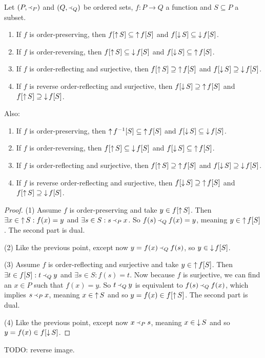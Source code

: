 \begin{lemma} \label{lemma:imageUpDownsets}
Let $(P, \Yleft_P)$ and $(Q, \Yleft_Q)$ be ordered sets, $f: P\to Q$ a function and $S\subseteq P$ a subset.
\begin{enumerate}
\item If $f$ is order-preserving, then $f[\mathop{\uparrow} S] \subseteq \mathop{\uparrow} f[S]$ and $f[\mathop{\downarrow} S] \subseteq \mathop{\downarrow} f[S]$.
\item If $f$ is order-reversing, then $f[\mathop{\uparrow} S] \subseteq \mathop{\downarrow} f[S]$ and $f[\mathop{\downarrow} S] \subseteq \mathop{\uparrow} f[S]$.
\item If $f$ is order-reflecting and surjective, then $f[\mathop{\uparrow} S] \supseteq \mathop{\uparrow} f[S]$ and $f[\mathop{\downarrow} S] \supseteq \mathop{\downarrow} f[S]$.
\item If $f$ is reverse order-reflecting and surjective, then $f[\mathop{\downarrow} S] \supseteq \mathop{\uparrow} f[S]$ and $f[\mathop{\uparrow} S] \supseteq \mathop{\downarrow} f[S]$.
\end{enumerate}
Also:
\begin{enumerate}
\item If $f$ is order-preserving, then $\mathop{\uparrow} f^{-1}[S] \subseteq \mathop{\uparrow} f[S]$ and $f[\mathop{\downarrow} S] \subseteq \mathop{\downarrow} f[S]$.
\item If $f$ is order-reversing, then $f[\mathop{\uparrow} S] \subseteq \mathop{\downarrow} f[S]$ and $f[\mathop{\downarrow} S] \subseteq \mathop{\uparrow} f[S]$.
\item If $f$ is order-reflecting and surjective, then $f[\mathop{\uparrow} S] \supseteq \mathop{\uparrow} f[S]$ and $f[\mathop{\downarrow} S] \supseteq \mathop{\downarrow} f[S]$.
\item If $f$ is reverse order-reflecting and surjective, then $f[\mathop{\downarrow} S] \supseteq \mathop{\uparrow} f[S]$ and $f[\mathop{\uparrow} S] \supseteq \mathop{\downarrow} f[S]$.
\end{enumerate}
\end{lemma}
\begin{proof}
(1) Assume $f$ is order-preserving and take $y\in f[\mathop{\uparrow} S]$. Then $\exists x\in \mathop{\uparrow} S: f(x) = y$ and $\exists s\in S: s\Yleft_P x$. So $f(s) \Yleft_Q f(x) = y$, meaning $y\in \mathop{\uparrow} f[S]$. The second part is dual.

(2) Like the previous point, except now $y = f(x) \Yleft_Q f(s)$, so $y \in \mathop{\downarrow} f[S]$.

(3) Assume $f$ is order-reflecting and surjective and take $y\in \mathop{\uparrow} f[S]$. Then $\exists t\in f[S]: t \Yleft_Q y$ and $\exists s\in S: f(s) = t$. Now because $f$ is surjective, we can find an $x\in P$ such that $f(x) = y$. So $t \Yleft_Q y$ is equivalent to $f(s) \Yleft_Q f(x)$, which implies $s \Yleft_P x$, meaning $x\in \mathop{\uparrow} S$ and so $y = f(x) \in f[\mathop{\uparrow} S]$. The second part is dual.

(4) Like the previous point, except now $x\Yleft_P s$, meaning $x\in \mathop{\downarrow} S$ and so $y = f(x) \in f[\mathop{\downarrow} S]$.
\end{proof}
TODO: reverse image.

